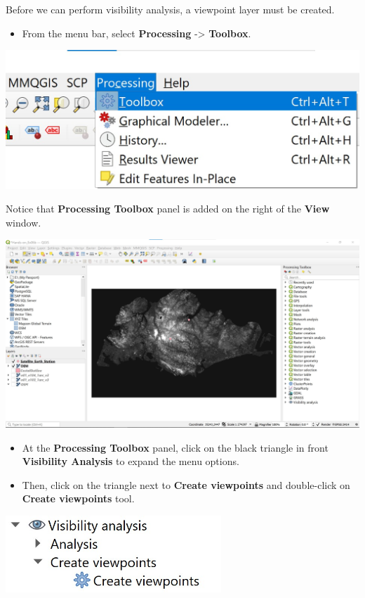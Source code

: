 \documentclass[
  letterpaper,
  DIV=11,
  numbers=noendperiod]{scrreprt}
\providecommand{\tightlist}{%
  \setlength{\itemsep}{0pt}\setlength{\parskip}{0pt}}\usepackage{longtable,booktabs,array}
\begin{document}
Before we can perform visibility analysis, a viewpoint layer must be
created.

\begin{itemize}
\tightlist
\item
  From the menu bar, select \textbf{Processing} -\textgreater{}
  \textbf{Toolbox}.
\end{itemize}

\includegraphics{./img06/image57.jpg}

Notice that \textbf{Processing Toolbox} panel is added on the right of
the \textbf{View} window.

\includegraphics{./img06/image58.jpg}

\begin{itemize}
\item
  At the \textbf{Processing Toolbox} panel, click on the black triangle
  in front \textbf{Visibility Analysis} to expand the menu options.
\item
  Then, click on the triangle next to \textbf{Create viewpoints} and
  double-click on \textbf{Create viewpoints} tool.
\end{itemize}

\includegraphics[width=3.19792in,height=\textheight]{./img06/image59.jpg}
\end{document}
